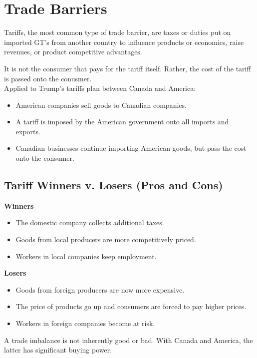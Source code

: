 \section{Trade Barriers}

\begin{definition}[Tariff]
Tariffs, the most common type of trade barrier, are taxes 
or duties put on imported GT's from another country to influence 
products or economics, raise revenues, or product competitive advantages.
\end{definition}

It is not the consumer that pays for the tariff itself. Rather,
the cost of the tariff is passed onto the conusmer.\\ 

Applied to Trump's tariffs plan between Canada and America:
\begin{itemize}
  \item American companies sell goods to Canadian companies.
  \item A tariff is imposed by the American government onto all imports and exports.
  \item Canadian businesses continue importing American goods, but pass the cost onto the consumer.
\end{itemize}

\subsection{Tariff Winners v. Losers (Pros and Cons)}
\textbf{Winners}
\begin{itemize}
  \item The domestic company collects additional taxes.
  \item Goods from local producers are more competitively priced.
  \item Workers in local companies keep employment.
\end{itemize}
\textbf{Losers}
\begin{itemize}
  \item Goods from foreign producers are now more expensive.
  \item The price of products go up and consumers are forced to pay higher prices.
  \item Workers in foreign companies become at risk.
\end{itemize}

A trade imbalance is not inherently good or bad.
With Canada and America, the latter has significant buying power.

